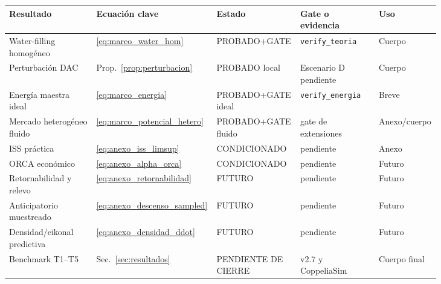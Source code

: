 \begingroup
\small
\setlength{\tabcolsep}{3pt}
\begin{longtable}{@{}p{0.20\linewidth}p{0.15\linewidth}p{0.17\linewidth}p{0.18\linewidth}p{0.13\linewidth}@{}}
\toprule
\textbf{Resultado} & \textbf{Ecuación clave} & \textbf{Estado} & \textbf{Gate o evidencia} & \textbf{Uso} \\
\midrule
Water-filling homogéneo & \eqref{eq:marco_water_hom} & PROBADO+GATE &
\texttt{verify\_teoria} & Cuerpo \\
Perturbación DAC & Prop.~\ref{prop:perturbacion} & PROBADO local &
Escenario D pendiente & Cuerpo \\
Energía maestra ideal & \eqref{eq:marco_energia} & PROBADO+GATE ideal &
\texttt{verify\_energia} & Breve \\
Mercado heterogéneo fluido & \eqref{eq:marco_potencial_hetero} & PROBADO+GATE fluido &
gate de extensiones & Anexo/cuerpo \\
ISS práctica & \eqref{eq:anexo_iss_limsup} & CONDICIONADO &
pendiente & Anexo \\
ORCA económico & \eqref{eq:anexo_alpha_orca} & CONDICIONADO &
pendiente & Futuro \\
Retornabilidad y relevo & \eqref{eq:anexo_retornabilidad} & FUTURO &
pendiente & Futuro \\
Anticipatorio muestreado & \eqref{eq:anexo_descenso_sampled} & FUTURO &
pendiente & Futuro \\
Densidad/eikonal predictiva & \eqref{eq:anexo_densidad_ddot} & FUTURO &
pendiente & Futuro \\
Benchmark T1--T5 & Sec.~\ref{sec:resultados} & PENDIENTE DE CIERRE &
v2.7 y CoppeliaSim & Cuerpo final \\
\bottomrule
\end{longtable}
\endgroup

